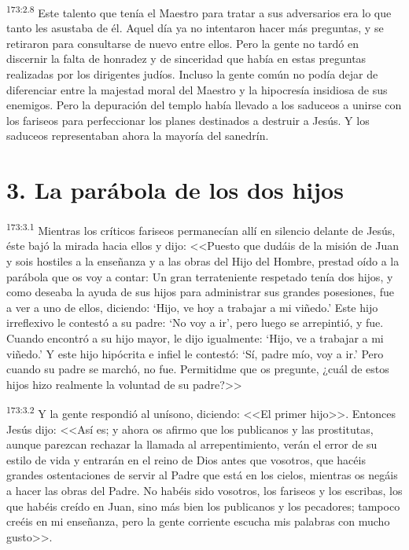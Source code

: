 \par 
\textsuperscript{173:2.8} Este talento que tenía el Maestro para tratar a sus adversarios era lo que tanto les asustaba de él. Aquel día ya no intentaron hacer más preguntas, y se retiraron para consultarse de nuevo entre ellos. Pero la gente no tardó en discernir la falta de honradez y de sinceridad que había en estas preguntas realizadas por los dirigentes judíos. Incluso la gente común no podía dejar de diferenciar entre la majestad moral del Maestro y la hipocresía insidiosa de sus enemigos. Pero la depuración del templo había llevado a los saduceos a unirse con los fariseos para perfeccionar los planes destinados a destruir a Jesús. Y los saduceos representaban ahora la mayoría del sanedrín.

\section*{3. La parábola de los dos hijos}
\par 
\textsuperscript{173:3.1} Mientras los críticos fariseos permanecían allí en silencio delante de Jesús, éste bajó la mirada hacia ellos y dijo: <<Puesto que dudáis de la misión de Juan y sois hostiles a la enseñanza y a las obras del Hijo del Hombre, prestad oído a la parábola que os voy a contar: Un gran terrateniente respetado tenía dos hijos, y como deseaba la ayuda de sus hijos para administrar sus grandes posesiones, fue a ver a uno de ellos, diciendo: `Hijo, ve hoy a trabajar a mi viñedo.' Este hijo irreflexivo le contestó a su padre: `No voy a ir', pero luego se arrepintió, y fue. Cuando encontró a su hijo mayor, le dijo igualmente: `Hijo, ve a trabajar a mi viñedo.' Y este hijo hipócrita e infiel le contestó: `Sí, padre mío, voy a ir.' Pero cuando su padre se marchó, no fue. Permitidme que os pregunte, ¿cuál de estos hijos hizo realmente la voluntad de su padre?>>

\par 
\textsuperscript{173:3.2} Y la gente respondió al unísono, diciendo: <<El primer hijo>>. Entonces Jesús dijo: <<Así es; y ahora os afirmo que los publicanos y las prostitutas, aunque parezcan rechazar la llamada al arrepentimiento, verán el error de su estilo de vida y entrarán en el reino de Dios antes que vosotros, que hacéis grandes ostentaciones de servir al Padre que está en los cielos, mientras os negáis a hacer las obras del Padre. No habéis sido vosotros, los fariseos y los escribas, los que habéis creído en Juan, sino más bien los publicanos y los pecadores; tampoco creéis en mi enseñanza, pero la gente corriente escucha mis palabras con mucho gusto>>.

